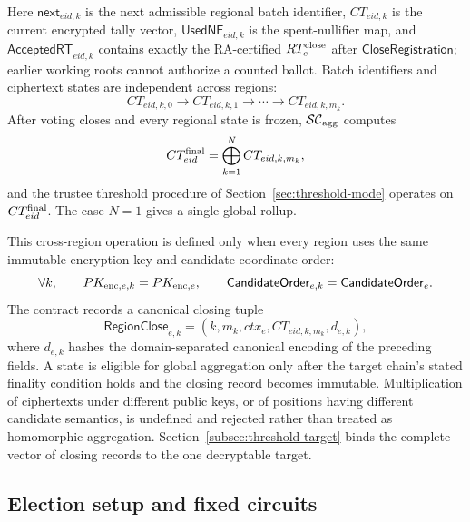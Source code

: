 \documentclass[pdflatex,sn-mathphys-num]{sn-jnl}%
\theoremstyle{thmstyleone}%
\theoremstyle{thmstyletwo}%
\theoremstyle{thmstylethree}%
\begin{document}
Here $\mathsf{next}_{eid,k}$ is the next admissible regional batch identifier, $CT_{eid,k}$ is the current encrypted tally vector, $\mathsf{UsedNF}_{eid,k}$ is the spent-nullifier map, and $\mathsf{AcceptedRT}_{eid,k}$ contains exactly the RA-certified $RT_e^{\rm close}$ after $\mathsf{CloseRegistration}$; earlier working roots cannot authorize a counted ballot. Batch identifiers and ciphertext states are independent across regions:
\[
 CT_{eid,k,0}\longrightarrow CT_{eid,k,1}\longrightarrow\cdots
 \longrightarrow CT_{eid,k,m_k}.
\]
After voting closes and every regional state is frozen, $\mathcal{SC}_{\rm agg}$ computes
\[
 CT_{eid}^{\rm final}=\bigoplus_{k=1}^{N}CT_{eid,k,m_k},
\]
and the trustee threshold procedure of Section~\ref{sec:threshold-mode}
operates on $CT_{eid}^{\rm final}$. The case $N=1$ gives a single global
rollup.

This cross-region operation is defined only when every region uses the same immutable encryption key and candidate-coordinate order:
\[
 \forall k,\qquad PK_{{\rm enc},e,k}=PK_{{\rm enc},e},
 \qquad
 \mathsf{CandidateOrder}_{e,k}=\mathsf{CandidateOrder}_{e}.
\]
The contract records a canonical closing tuple
\[
 \mathsf{RegionClose}_{e,k}=
 (k,m_k,ctx_e,CT_{eid,k,m_k},d_{e,k}),
\]
where $d_{e,k}$ hashes the domain-separated canonical encoding of the preceding fields.  A state is eligible for global aggregation only after the target chain's stated finality condition holds and the closing record becomes immutable.  Multiplication of ciphertexts under different public keys, or of positions having different candidate semantics, is undefined and rejected rather than treated as homomorphic aggregation.  Section~\ref{subsec:threshold-target} binds the complete vector of closing records to the one decryptable target.

\subsection{Election setup and fixed circuits}\label{subsec:batch-setup}
\end{document}
